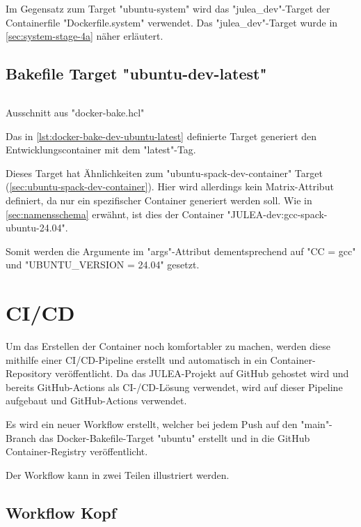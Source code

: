 Im Gegensatz zum Target "ubuntu-system" wird das "julea\_dev"-Target der Containerfile "Dockerfile.system" verwendet. Das "julea\_dev"-Target wurde in \cref{sec:system-stage-4a} näher erläutert.

\subsection{Bakefile Target "ubuntu-dev-latest"}

\begin{listing}[H]
    \inputminted[firstline=96]{./lexers/docker-bake-lexer.py}{./code-examples/docker-bake.hcl}
    \caption{Ausschnitt aus "docker-bake.hcl"}
    \label{lst:docker-bake-dev-ubuntu-latest}
\end{listing}

Das in \cref{lst:docker-bake-dev-ubuntu-latest} definierte Target generiert den Entwicklungscontainer mit dem "latest"-Tag. 

Dieses Target hat Ähnlichkeiten zum "ubuntu-spack-dev-container" Target (\cref{sec:ubuntu-spack-dev-container}). Hier wird allerdings kein Matrix-Attribut definiert, da nur ein spezifischer Container generiert werden soll. Wie in \cref{sec:namensschema} erwähnt, ist dies der Container "JULEA-dev:gcc-spack-ubuntu-24.04". 

Somit werden die Argumente im "args"-Attribut dementsprechend auf "CC = gcc" und "UBUNTU\_VERSION = 24.04" gesetzt.

\pagebreak

\section{CI/CD} \label{sec:ci-cd-impl}

Um das Erstellen der Container noch komfortabler zu machen, werden diese mithilfe einer CI/CD-Pipeline erstellt und automatisch in ein Container-Repository veröffentlicht. Da das JULEA-Projekt auf GitHub gehostet wird und bereits GitHub-Actions als CI-/CD-Lösung verwendet, wird auf dieser Pipeline aufgebaut und GitHub-Actions verwendet.

Es wird ein neuer Workflow erstellt, welcher bei jedem Push auf den "main"-Branch das Docker-Bakefile-Target "ubuntu" erstellt und in die GitHub Container-Registry veröffentlicht.

Der Workflow kann in zwei Teilen illustriert werden.

\subsection{Workflow Kopf}

